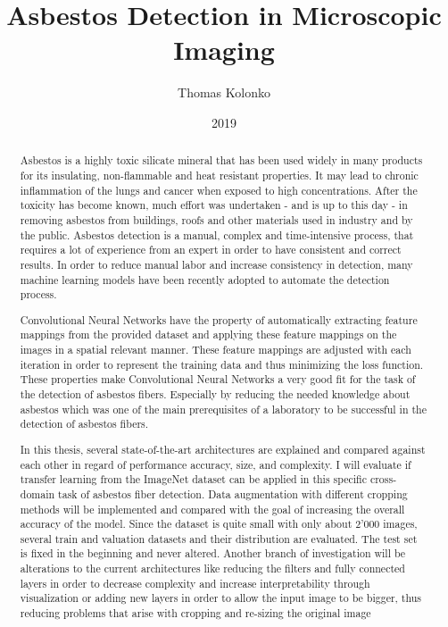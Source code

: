\documentclass[11pt,a4paper,twoside,hidelinks,]{rvsmaster}
\author{Thomas Kolonko}
\title{Asbestos Detection in Microscopic Imaging}
\date{2019}
\begin{document}
\maketitle
\thispagestyle{empty}
\mbox{}

\newpage

\begin{abstract}

Asbestos is a highly toxic silicate mineral that has been used widely in many products for its insulating, non-flammable and heat resistant properties. It may lead to chronic inflammation of the lungs and cancer when exposed to high concentrations. After the toxicity has become known, much effort was undertaken - and is up to this day - in removing asbestos from buildings, roofs and other materials used in industry and by the public. Asbestos detection is a manual, complex and time-intensive process, that requires a lot of experience from an expert in order to have consistent and correct results. In order to reduce manual labor and increase consistency in detection, many machine learning models have been recently adopted to automate the detection process.

\vspace{5mm} %

Convolutional Neural Networks have the property of automatically extracting feature mappings from the provided dataset and applying these feature mappings on the images in a spatial relevant manner. These feature mappings are adjusted with each iteration in order to represent the training data and thus minimizing the loss function. These properties make Convolutional Neural Networks a very good fit for the task of the detection of asbestos fibers. Especially by reducing the needed knowledge about asbestos which was one of the main prerequisites of a laboratory to be successful in the detection of asbestos fibers.

\vspace{5mm} %

In this thesis, several state-of-the-art architectures are explained and compared against each other in regard of performance accuracy, size, and complexity. I will evaluate if transfer learning from the ImageNet dataset can be applied in this specific cross-domain task of asbestos fiber detection. Data augmentation with different cropping methods will be implemented and compared with the goal of increasing the overall accuracy of the model. Since the dataset is quite small with only about 2'000 images, several train and valuation datasets and their distribution are evaluated. The test set is fixed in the beginning and never altered. Another branch of investigation will be alterations to the current architectures like reducing the filters and fully connected layers in order to decrease complexity and increase interpretability through visualization or adding new layers in order to allow the input image to be bigger, thus reducing problems that arise with cropping and re-sizing the original image 

\end{abstract}
\end{document}
